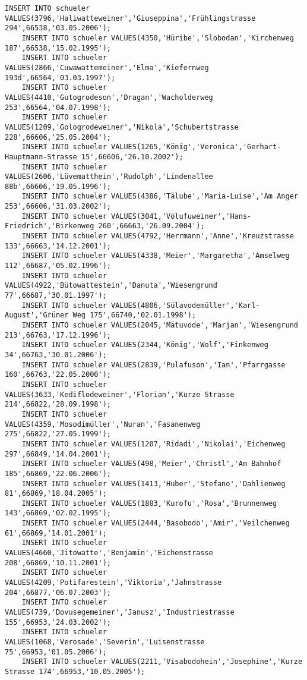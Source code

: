 \begin{lstlisting}[breaklines=True, numbers=none, basicstyle=\tiny, keepspaces=false]
	INSERT INTO schueler VALUES(3796,'Haliwatteweiner','Giuseppina','Frühlingstrasse 294',66538,'03.05.2006');
	INSERT INTO schueler VALUES(4350,'Hüribe','Slobodan','Kirchenweg 187',66538,'15.02.1995');
	INSERT INTO schueler VALUES(2866,'Cuwawattemeiner','Elma','Kiefernweg 193d',66564,'03.03.1997');
	INSERT INTO schueler VALUES(4410,'Gutogrodeson','Dragan','Wacholderweg 253',66564,'04.07.1998');
	INSERT INTO schueler VALUES(1209,'Gologrodeweiner','Nikola','Schubertstrasse 228',66606,'25.05.2004');
	INSERT INTO schueler VALUES(1265,'König','Veronica','Gerhart-Hauptmann-Strasse 15',66606,'26.10.2002');
	INSERT INTO schueler VALUES(2606,'Lüvematthein','Rudolph','Lindenallee 88b',66606,'19.05.1996');
	INSERT INTO schueler VALUES(4386,'Tälube','Maria-Luise','Am Anger 253',66606,'31.03.2002');
	INSERT INTO schueler VALUES(3041,'Völufuweiner','Hans-Friedrich','Birkenweg 260',66663,'26.09.2004');
	INSERT INTO schueler VALUES(4792,'Herrmann','Anne','Kreuzstrasse 133',66663,'14.12.2001');
	INSERT INTO schueler VALUES(4338,'Meier','Margaretha','Amselweg 112',66687,'05.02.1996');
	INSERT INTO schueler VALUES(4922,'Bütowattestein','Danuta','Wiesengrund 77',66687,'30.01.1997');
	INSERT INTO schueler VALUES(4806,'Sülavodemüller','Karl-August','Grüner Weg 175',66740,'02.01.1998');
	INSERT INTO schueler VALUES(2045,'Mätuvode','Marjan','Wiesengrund 213',66763,'17.12.1996');
	INSERT INTO schueler VALUES(2344,'König','Wolf','Finkenweg 34',66763,'30.01.2006');
	INSERT INTO schueler VALUES(2839,'Pulafuson','Ian','Pfarrgasse 160',66763,'22.05.2000');
	INSERT INTO schueler VALUES(3633,'Kediflodeweiner','Florian','Kurze Strasse 214',66822,'28.09.1998');
	INSERT INTO schueler VALUES(4359,'Mosodimüller','Nuran','Fasanenweg 275',66822,'27.05.1999');
	INSERT INTO schueler VALUES(1207,'Ridadi','Nikolai','Eichenweg 297',66849,'14.04.2001');
	INSERT INTO schueler VALUES(498,'Meier','Christl','Am Bahnhof 185',66869,'22.06.2006');
	INSERT INTO schueler VALUES(1413,'Huber','Stefano','Dahlienweg 81',66869,'18.04.2005');
	INSERT INTO schueler VALUES(1883,'Kurofu','Rosa','Brunnenweg 143',66869,'02.02.1995');
	INSERT INTO schueler VALUES(2444,'Basobodo','Amir','Veilchenweg 61',66869,'14.01.2001');
	INSERT INTO schueler VALUES(4660,'Jitowatte','Benjamin','Eichenstrasse 208',66869,'10.11.2001');
	INSERT INTO schueler VALUES(4209,'Potifarestein','Viktoria','Jahnstrasse 204',66877,'06.07.2003');
	INSERT INTO schueler VALUES(739,'Dovusegemeiner','Janusz','Industriestrasse 155',66953,'24.03.2002');
	INSERT INTO schueler VALUES(1068,'Verosade','Severin','Luisenstrasse 75',66953,'01.05.2006');
	INSERT INTO schueler VALUES(2211,'Visabodohein','Josephine','Kurze Strasse 174',66953,'10.05.2005');

\end{lstlisting}
